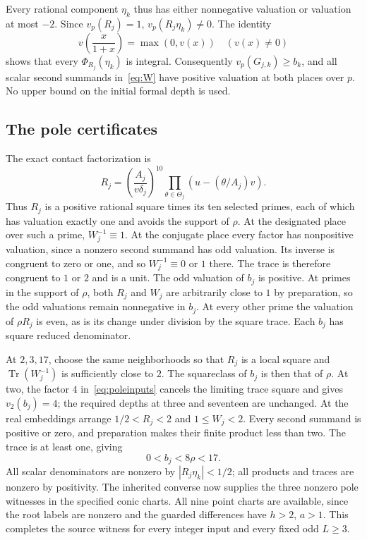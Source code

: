 \documentclass[11pt,a4paper]{article}
\DeclareMathOperator{\Tr}{Tr}\DeclareMathOperator{\Nm}{N}
\begin{document}
Every rational component $\eta_k$ thus has either nonnegative
valuation or valuation at most $-2$. Since $v_p(R_j)=1$,
$v_p(R_j\eta_k)\ne0$. The identity
\[
 v\left(\frac{x}{1+x}\right)=\max(0,v(x))\quad(v(x)\ne0)
\]
shows that every $\Phi_{R_j}(\eta_k)$ is integral.
Consequently $v_p(G_{j,k})\ge b_k$, and all scalar second summands
in~\eqref{eq:W} have positive valuation at both places over $p$.
No upper bound on the initial formal depth is used.

\subsection{The pole certificates}

The exact contact factorization is
\[
 R_j=\left(\frac{A_j}{v\delta_j}\right)^{10}
                  \prod_{\theta\in\Theta_j}
                         \left(u-(\theta/A_j)v\right).
\]
Thus $R_j$ is a positive rational square times its ten selected
primes, each of which has valuation exactly one and avoids the
support of $\rho$. At the designated place over such a prime,
$W_j^{-1}\equiv1$. At the conjugate place every factor has
nonpositive valuation, since a nonzero second summand has odd
valuation. Its inverse is congruent to zero or one, and so
$W_j^{-1}\equiv0$ or $1$ there. The trace is therefore congruent
to $1$ or $2$ and is a unit. The odd valuation of $b_j$ is positive.
At primes in the support of $\rho$, both $R_j$ and $W_j$ are
arbitrarily close to $1$ by preparation, so the odd valuations
remain nonnegative in $b_j$. At every other prime the valuation
of $\rho R_j$ is even, as is its change under division by the
square trace. Each $b_j$ has square reduced denominator.

At $2,3,17$, choose the same neighborhoods so that $R_j$ is a
local square and $\Tr(W_j^{-1})$ is sufficiently close to $2$.
The squareclass of $b_j$ is then that of $\rho$. At two, the
factor $4$ in~\eqref{eq:poleinputs} cancels the limiting trace
square and gives $v_2(b_j)=4$; the required depths at three and
seventeen are unchanged. At the real embeddings arrange
$1/2<R_j<2$ and $1\le W_j<2$. Every second summand is positive
or zero, and preparation makes their finite product less than two.
The trace is at least one, giving
\[
                              0<b_j<8\rho<17.
\]
All scalar denominators are nonzero by $|R_j\eta_k|<1/2$;
all products and traces are nonzero by positivity. The inherited
converse now supplies the three nonzero pole witnesses in the
specified conic charts. All nine point charts are available, since
the root labels are nonzero and the guarded differences have
$h>2$, $a>1$. This completes the source witness for every integer
input and every fixed odd $L\ge3$.
\end{document}
